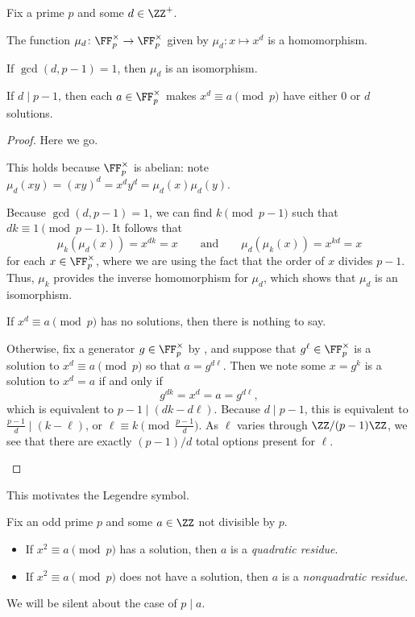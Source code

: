 \documentclass[../notes.tex]{subfiles}
\begin{document}
\begin{corollary}
	Fix a prime $p$ and some $d\in\ZZ^+$.
	\begin{listalph}
		\item The function $\mu_d\colon\FF_p^\times\to\FF_p^\times$ given by $\mu_d\colon x\mapsto x^d$ is a homomorphism.
		\item If $\gcd(d,p-1)=1$, then $\mu_d$ is an isomorphism.
		\item If $d\mid p-1$, then each $a\in\FF_p^\times$ makes $x^d\equiv a\pmod p$ have either $0$ or $d$ solutions.
	\end{listalph}
\end{corollary}
\begin{proof}
	Here we go.
	\begin{listalph}
		\item This holds because $\FF_p^\times$ is abelian: note $\mu_d(xy)=(xy)^d=x^dy^d=\mu_d(x)\mu_d(y)$.
		\item Because $\gcd(d,p-1)=1$, we can find $k\pmod{p-1}$ such that $dk\equiv1\pmod{p-1}$. It follows that
		\[\mu_k(\mu_d(x))=x^{dk}=x\qquad\text{and}\qquad\mu_d(\mu_k(x))=x^{kd}=x\]
		for each $x\in\FF_p^\times$, where we are using the fact that the order of $x$ divides $p-1$. Thus, $\mu_k$ provides the inverse homomorphism for $\mu_d$, which shows that $\mu_d$ is an isomorphism.
		\item If $x^d\equiv a\pmod p$ has no solutions, then there is nothing to say.
		
		Otherwise, fix a generator $g\in\FF_p^\times$ by , and suppose that $g^\ell\in\FF_p^\times$ is a solution to $x^d\equiv a\pmod p$ so that $a=g^{d\ell}$. Then we note some $x=g^k$ is a solution to $x^d=a$ if and only if
		\[g^{dk}=x^d=a=g^{d\ell},\]
		which is equivalent to $p-1\mid(dk-d\ell)$. Because $d\mid p-1$, this is equivalent to $\frac{p-1}d\mid (k-\ell)$, or $\ell\equiv k\pmod{\frac{p-1}d}$. As $\ell$ varies through $\ZZ/(p-1)\ZZ$, we see that there are exactly $(p-1)/d$ total options present for $\ell$.
		\qedhere
	\end{listalph}
\end{proof}
This motivates the Legendre symbol.
\begin{definition}
	Fix an odd prime $p$ and some $a\in\ZZ$ not divisible by $p$.
	\begin{itemize}
		\item If $x^2\equiv a\pmod p$ has a solution, then $a$ is a \textit{quadratic residue}.
		\item If $x^2\equiv a\pmod p$ does not have a solution, then $a$ is a \textit{nonquadratic residue}.
	\end{itemize}
	We will be silent about the case of $p\mid a$.
\end{definition}
\end{document}
